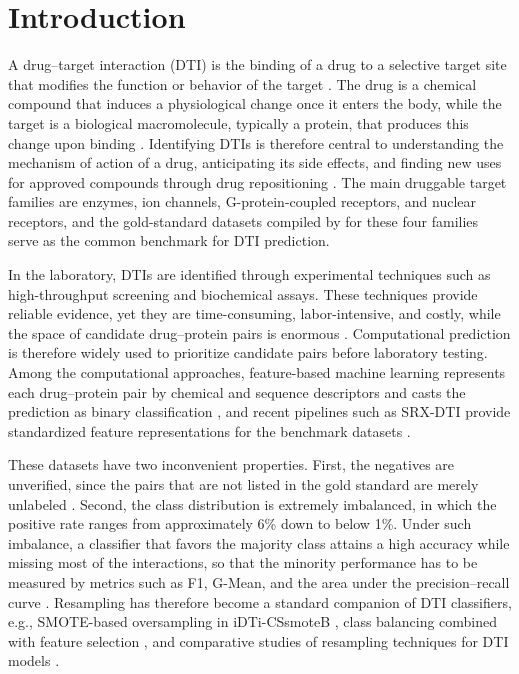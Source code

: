 \documentclass[pdflatex,sn-basic]{sn-jnl}
\begin{document}

\maketitle

\section{Introduction}

A drug--target interaction (DTI) is the binding of a drug to a
selective target site that modifies the function or behavior of the
target \citep{azlimkhan2023comparative}. The drug is a chemical
compound that induces a physiological change once it enters the body,
while the target is a biological macromolecule, typically a protein,
that produces this change upon binding \citep{you2018drug}. Identifying
DTIs is therefore central to understanding the mechanism of action of a
drug, anticipating its side effects, and finding new uses for approved
compounds through drug repositioning \citep{bagherian2021machine,
azlimkhan2023comparative}. The main druggable target families are
enzymes, ion channels, G-protein-coupled receptors, and nuclear
receptors, and the gold-standard datasets compiled by
\citet{yamanishi2008prediction} for these four families serve as the
common benchmark for DTI prediction.

In the laboratory, DTIs are identified through experimental techniques
such as high-throughput screening and biochemical assays. These
techniques provide reliable evidence, yet they are time-consuming,
labor-intensive, and costly, while the space of candidate drug--protein
pairs is enormous \citep{you2018drug, barkat2021drug}. Computational
prediction is therefore widely used to prioritize candidate pairs before
laboratory testing. Among the computational approaches, feature-based
machine learning represents each drug--protein pair by chemical and
sequence descriptors and casts the prediction as binary classification
\citep{chen2018machine}, and recent pipelines such as SRX-DTI provide
standardized feature representations for the benchmark datasets
\citep{khojasteh2023improving}.

These datasets have two inconvenient properties. First, the negatives
are unverified, since the pairs that are not listed in the gold standard
are merely unlabeled \citep{shi2019predicting}. Second, the class
distribution is extremely imbalanced, in which the positive rate ranges
from approximately 6\% down to below 1\%. Under such imbalance, a
classifier that favors the majority class attains a high accuracy while
missing most of the interactions, so that the minority performance has
to be measured by metrics such as F1, G-Mean, and the area under the
precision--recall curve \citep{saito2015precision}. Resampling has
therefore become a standard companion of DTI classifiers, e.g.,
SMOTE-based oversampling in iDTi-CSsmoteB \citep{mahmud2019idti}, class
balancing combined with feature selection \citep{redkar2020machine},
and comparative studies of resampling techniques for DTI models
\citep{azlimkhan2023comparative}.
\end{document}
